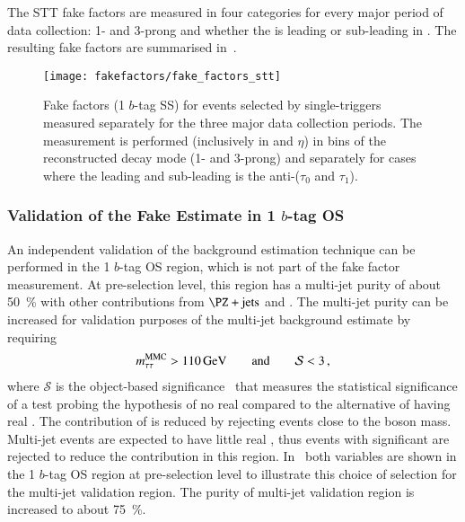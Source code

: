 
The STT fake factors are measured in four categories for every major
period of data collection: 1- and 3-prong \tauhadvis and whether the
\tauhadvis is leading or sub-leading in \pT. The resulting fake
factors are summarised in~.

\begin{figure}[htbp]
  \centering

  \texttt{[image: fakefactors/fake\_factors\_stt]}

  \caption{Fake factors (1 $b$-tag SS) for events selected by
    single-\tauhadvis triggers measured separately for the three major
    data collection periods. The measurement is performed (inclusively
    in \tauhadvis \pT and $\eta$) in bins of the reconstructed
    \tauhadvis decay mode (1- and 3-prong) and separately for cases
    where the \pT leading and sub-leading \tauhadvis is the
    anti-\tauhadvis ($\tau_0$ and $\tau_1$).}%
  \label{fig:mjfakes_stt_ffs}

\end{figure}


\subsubsection{Validation of the Fake Estimate in 1 $b$-tag OS}

An independent validation of the background estimation technique can
be performed in the 1 $b$-tag OS region, which is not part of the fake
factor measurement. At pre-selection level, this region has a
multi-jet purity of about \SI{50}{\percent} with other contributions
from $\Zjets$ and \ttbar. The multi-jet purity can be increased for
validation purposes of the multi-jet background estimate by requiring
\begin{align*}
  m_{\tau\tau}^\text{MMC} > \SI{110}{\ensuremath{\text{GeV}}} \qquad \text{and} \qquad \mathcal{S} < 3 \,\text{,}
\end{align*}
where $\mathcal{S}$ is the object-based \pTmissAbs
significance~\cite{ATLAS-CONF-2018-038} that measures the statistical
significance of a test probing the hypothesis of no real \pTmissAbs
compared to the alternative of having real \pTmissAbs. The
contribution of \Zjets is reduced by rejecting events close to the \PZ
boson mass. Multi-jet events are expected to have little real
\pTmissAbs, thus events with significant \pTmissAbs are rejected to
reduce the \ttbar contribution in this
region. In~ both variables are
shown in the 1 $b$-tag OS region at pre-selection level to illustrate
this choice of selection for the multi-jet validation region. The
purity of multi-jet validation region is increased to about
\SI{75}{\percent}.

